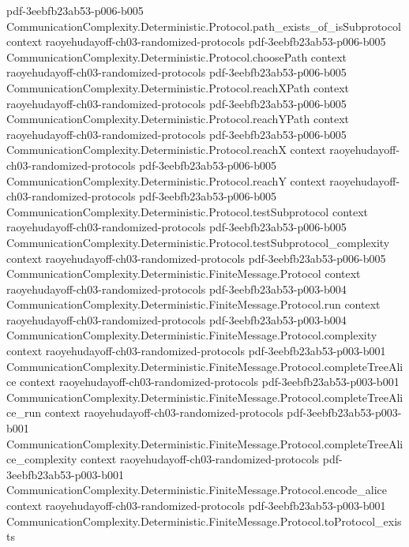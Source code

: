 \begin{theorem}
  {pdf-3eebfb23ab53-p006-b005}
\proofstep
  {CommunicationComplexity.Deterministic.Protocol.path_exists_of_isSubprotocol}
  {context}
  {raoyehudayoff-ch03-randomized-protocols}
  {pdf-3eebfb23ab53-p006-b005}
\proofstep
  {CommunicationComplexity.Deterministic.Protocol.choosePath}
  {context}
  {raoyehudayoff-ch03-randomized-protocols}
  {pdf-3eebfb23ab53-p006-b005}
\proofstep
  {CommunicationComplexity.Deterministic.Protocol.reachXPath}
  {context}
  {raoyehudayoff-ch03-randomized-protocols}
  {pdf-3eebfb23ab53-p006-b005}
\proofstep
  {CommunicationComplexity.Deterministic.Protocol.reachYPath}
  {context}
  {raoyehudayoff-ch03-randomized-protocols}
  {pdf-3eebfb23ab53-p006-b005}
\proofstep
  {CommunicationComplexity.Deterministic.Protocol.reachX}
  {context}
  {raoyehudayoff-ch03-randomized-protocols}
  {pdf-3eebfb23ab53-p006-b005}
\proofstep
  {CommunicationComplexity.Deterministic.Protocol.reachY}
  {context}
  {raoyehudayoff-ch03-randomized-protocols}
  {pdf-3eebfb23ab53-p006-b005}
\proofstep
  {CommunicationComplexity.Deterministic.Protocol.testSubprotocol}
  {context}
  {raoyehudayoff-ch03-randomized-protocols}
  {pdf-3eebfb23ab53-p006-b005}
\proofstep
  {CommunicationComplexity.Deterministic.Protocol.testSubprotocol_complexity}
  {context}
  {raoyehudayoff-ch03-randomized-protocols}
  {pdf-3eebfb23ab53-p006-b005}
\proofstep
  {CommunicationComplexity.Deterministic.FiniteMessage.Protocol}
  {context}
  {raoyehudayoff-ch03-randomized-protocols}
  {pdf-3eebfb23ab53-p003-b004}
\proofstep
  {CommunicationComplexity.Deterministic.FiniteMessage.Protocol.run}
  {context}
  {raoyehudayoff-ch03-randomized-protocols}
  {pdf-3eebfb23ab53-p003-b004}
\proofstep
  {CommunicationComplexity.Deterministic.FiniteMessage.Protocol.complexity}
  {context}
  {raoyehudayoff-ch03-randomized-protocols}
  {pdf-3eebfb23ab53-p003-b001}
\proofstep
  {CommunicationComplexity.Deterministic.FiniteMessage.Protocol.completeTreeAlice}
  {context}
  {raoyehudayoff-ch03-randomized-protocols}
  {pdf-3eebfb23ab53-p003-b001}
\proofstep
  {CommunicationComplexity.Deterministic.FiniteMessage.Protocol.completeTreeAlice_run}
  {context}
  {raoyehudayoff-ch03-randomized-protocols}
  {pdf-3eebfb23ab53-p003-b001}
\proofstep
  {CommunicationComplexity.Deterministic.FiniteMessage.Protocol.completeTreeAlice_complexity}
  {context}
  {raoyehudayoff-ch03-randomized-protocols}
  {pdf-3eebfb23ab53-p003-b001}
\proofstep
  {CommunicationComplexity.Deterministic.FiniteMessage.Protocol.encode_alice}
  {context}
  {raoyehudayoff-ch03-randomized-protocols}
  {pdf-3eebfb23ab53-p003-b001}
\proofstep
  {CommunicationComplexity.Deterministic.FiniteMessage.Protocol.toProtocol_exists}

\end{theorem}
